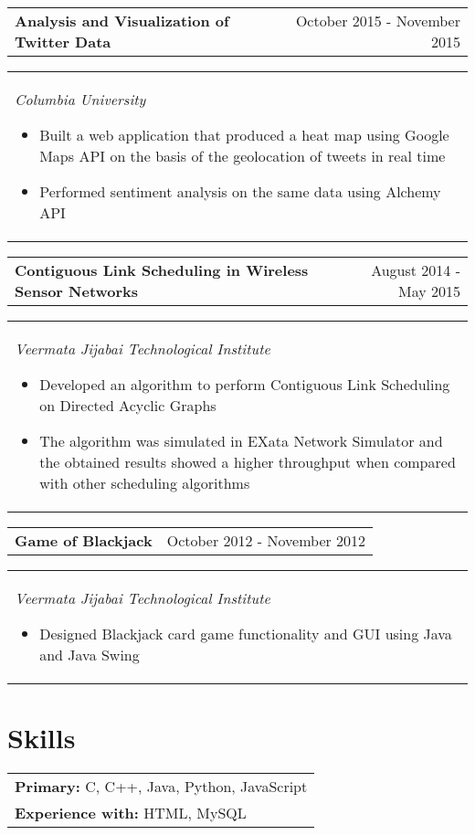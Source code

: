 \documentclass[margin,line]{res}
\begin{document}
\begin{resume}
\begin{tabular}{p{3.875in} r}
\bf Analysis and Visualization of Twitter Data & October 2015 - November 2015
\end{tabular}
\begin{tabular}{p{5.92in}}
\it Columbia University
\begin{itemize}
    \item \textup{Built a web application that produced a heat map using Google Maps API on the basis of the geolocation of tweets in real time}
    \item \textup{Performed sentiment analysis on the same data using Alchemy API}
\end{itemize}
\end{tabular}


\begin {tabular} {p{4.25in} r}
\bf Contiguous Link Scheduling in Wireless Sensor Networks & August 2014 - May 2015
\end{tabular}
\begin{tabular}{p{5.92in}}
\it Veermata Jijabai Technological Institute 
\begin{itemize}
    \item \textup{Developed an algorithm to perform Contiguous Link Scheduling on Directed Acyclic Graphs}
    \item \textup{The algorithm was simulated in EXata Network Simulator and the obtained results showed a higher throughput when compared with other scheduling algorithms}
\end{itemize}
\end{tabular}


\begin{tabular}{p{3.875in} r}
\bf Game of Blackjack   & October 2012 - November 2012
\end{tabular}
\begin{tabular} {p{5.92in}}
\it Veermata Jijabai Technological Institute
\begin{itemize}
    \item \textup{Designed Blackjack card game functionality and GUI using Java and Java Swing }
\end{itemize}
\end{tabular}


\section{\sc\bf Skills}
\begin{tabular}{p{5.92in}}
{\bf Primary:} C, C++, Java, Python, JavaScript\\
{\bf Experience with:} HTML, MySQL
\end{tabular}


\end{resume}
\end{document}
